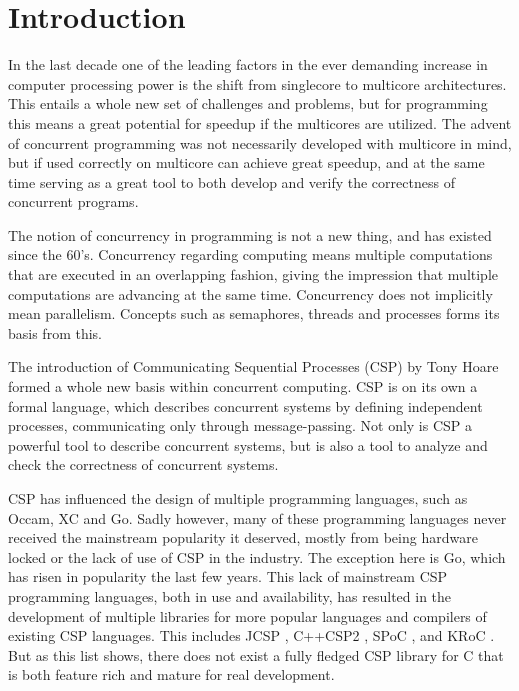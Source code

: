 
\chapter{Introduction}

In the last decade one of the leading factors in the ever demanding increase in computer processing power is the shift from singlecore to multicore architectures. This entails a whole new set of challenges and problems, but for programming this means a great potential for speedup if the multicores are utilized. The advent of concurrent programming was not necessarily developed with multicore in mind, but if used correctly on multicore can achieve great speedup, and at the same time serving as a great tool to both develop and verify the correctness of concurrent programs. 

The notion of concurrency in programming is not a new thing, and has existed since the 60's. Concurrency regarding computing means multiple computations that are executed in an overlapping fashion, giving the impression that multiple computations are advancing at the same time. Concurrency does not implicitly mean parallelism. Concepts such as semaphores, threads and processes forms its basis from this. 

The introduction of Communicating Sequential Processes (CSP) by Tony Hoare \citep{csp} formed a whole new basis within concurrent computing. CSP is on its own a formal language, which describes concurrent systems by defining independent processes, communicating only through message-passing. Not only is CSP a powerful tool to describe concurrent systems, but is also a tool to analyze and check the correctness of concurrent systems. 

CSP has influenced the design of multiple programming languages, such as Occam, XC and Go. Sadly however, many of these programming languages never received the mainstream popularity it deserved, mostly from being hardware locked  or the lack of use of CSP in the industry. The exception here is Go, which has risen in popularity the last few years. This lack of mainstream CSP programming languages, both in use and availability, has resulted in the development of multiple libraries for more popular languages and compilers of existing CSP languages. This includes JCSP \citep{jcsp}, C++CSP2 \citep{c++csp2}, SPoC \citep{spoc}, and KRoC \citep{kroc}. But as this list shows, there does not exist a fully fledged CSP library for C that is both feature rich and mature for real development. 

